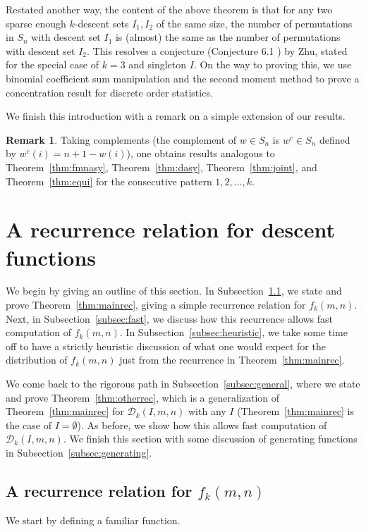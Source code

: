 \documentclass{amsart}
\theoremstyle{definition}
\newtheorem{remark}[theorem]{Remark}
\begin{document}
Restated another way, the content of the above theorem is that for any two sparse enough $k$-descent sets $I_1,I_2$ of the same size, the number of permutations in $S_n$ with descent set $I_1$ is (almost) the same as the number of permutations with descent set $I_2$. This resolves a conjecture (Conjecture 6.1 \cite{zhu2019enumerating}) by Zhu, stated for the special case of $k=3$ and singleton $I$. On the way to proving this, we use binomial coefficient sum manipulation and the second moment method to prove a concentration result for discrete order statistics.

We finish this introduction with a remark on a simple extension of our results.
\begin{remark}
Taking complements (the complement of $w\in S_n$ is $w^c\in S_n$ defined by $w^c(i)=n+1-w(i)$), one obtains results analogous to Theorem~\ref{thm:fmnasy}, Theorem~\ref{thm:dasy}, Theorem~\ref{thm:joint}, and Theorem~\ref{thm:equi} for the consecutive pattern $1,2,\ldots, k$.
\end{remark} 

\section{A recurrence relation for descent functions}\label{sec:rec}

We begin by giving an outline of this section. In Subsection~\ref{subsec:simprec}, we state and prove Theorem~\ref{thm:mainrec}, giving a simple recurrence relation for $f_k(m,n)$. Next, in Subsection~\ref{subsec:fast}, we discuss how this recurrence allows fast computation of $f_k(m,n)$. In Subsection~\ref{subsec:heuristic}, we take some time off to have a strictly heuristic discussion of what one would expect for the distribution of $f_k(m,n)$ just from the recurrence in Theorem~\ref{thm:mainrec}.

We come back to the rigorous path in Subsection~\ref{subsec:general}, where we state and prove Theorem~\ref{thm:otherrec}, which is a generalization of Theorem~\ref{thm:mainrec} for $\mathcal{D}_k(I,m,n)$ with any $I$ (Theorem~\ref{thm:mainrec} is the case of $I=\emptyset$). As before, we show how this allows fast computation of $\mathcal{D}_k(I,m,n)$. We finish this section with some discussion of generating functions in Subsection~\ref{subsec:generating}.

\subsection{A recurrence relation for $f_k(m,n)$}\label{subsec:simprec}
We start by defining a familiar function.
\end{document}
